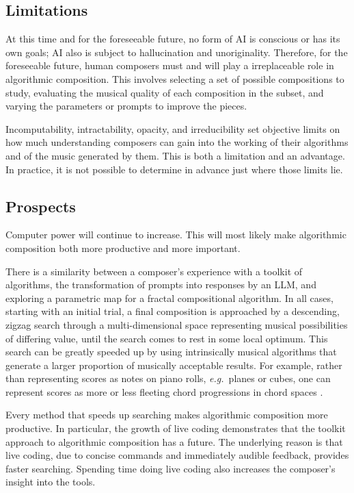 \documentclass[]{interact}
\theoremstyle{plain}%
\theoremstyle{definition}
\theoremstyle{remark}
\begin{document}
\subsection{Limitations}

At this time and for the foreseeable future, no form of AI is conscious or has its own goals; AI also is subject to hallucination and unoriginality. Therefore, for the foreseeable future, human composers must and will play a irreplaceable role in algorithmic composition. This involves selecting a set of possible compositions to study, evaluating the musical quality of each composition in the subset, and varying the parameters or prompts to improve  the pieces.

Incomputability, intractability, opacity, and irreducibility set objective limits on how much understanding composers can gain into the working of their algorithms and of the music generated by them. This is both a limitation and an advantage. In practice, it is not possible to determine in advance just where those limits lie.

\subsection{Prospects}

Computer power will continue to increase. This will most likely make algorithmic composition both more productive and more important.

There is a similarity between a composer's experience with a toolkit of algorithms, the transformation of prompts into responses by an LLM, and exploring a parametric map for a fractal compositional algorithm. In all cases, starting with an initial trial, a final composition is approached by a descending, zigzag search through a multi-dimensional space representing musical possibilities of differing value, until the search comes to rest in some local optimum. This search can be greatly speeded up by using intrinsically musical algorithms that generate a larger proportion of musically acceptable results. For example, rather than representing scores as notes on piano rolls, \emph{e.g.}\ planes or cubes, one can represent scores as more or less fleeting chord progressions in chord spaces \citep{gogins2006score, gogins2023scoregraphs}.

Every method that speeds up searching makes algorithmic composition more productive. In particular, the growth of live coding demonstrates that the toolkit approach to algorithmic composition has a future. The underlying reason is that live coding, due to concise commands and immediately audible feedback, provides faster searching. Spending time doing live coding also increases the composer's insight into the tools.
\end{document}
